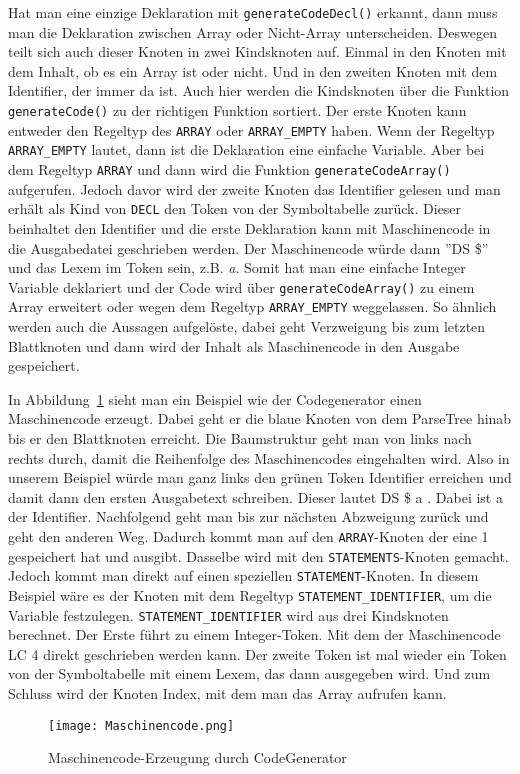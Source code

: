 Hat man eine einzige Deklaration mit \texttt{generateCodeDecl()} erkannt, dann muss man die Deklaration zwischen Array oder  Nicht-Array unterscheiden. Deswegen teilt sich auch dieser Knoten in zwei Kindsknoten auf. Einmal in den Knoten mit dem Inhalt, ob es ein Array ist oder nicht. Und in den zweiten Knoten mit dem Identifier, der immer da ist. Auch hier werden die Kindsknoten über die Funktion \texttt{generateCode()} zu der richtigen Funktion sortiert. Der erste Knoten kann entweder den Regeltyp des \texttt{ARRAY} oder \texttt{ARRAY\_EMPTY} haben. Wenn der Regeltyp \texttt{ARRAY\_EMPTY} lautet, dann ist die Deklaration eine einfache Variable. Aber bei dem Regeltyp \texttt{ARRAY} und dann wird die Funktion \texttt{generateCodeArray()} aufgerufen. Jedoch davor wird der zweite Knoten das Identifier gelesen und man erhält als Kind von \texttt{DECL} den Token von der Symboltabelle zurück. Dieser beinhaltet den Identifier und die erste Deklaration kann mit Maschinencode in die Ausgabedatei geschrieben werden. Der Maschinencode würde dann ''DS \$'' und das Lexem im Token sein, z.B. \emph{a}. Somit hat man eine einfache Integer Variable deklariert und der Code wird über \texttt{generateCodeArray()} zu einem Array erweitert oder wegen dem Regeltyp \texttt{ARRAY\_EMPTY} weggelassen. So ähnlich werden auch die Aussagen aufgelöste, dabei geht Verzweigung bis zum letzten Blattknoten und dann wird der Inhalt als Maschinencode in den Ausgabe gespeichert.



In Abbildung~\ref{fig:codegenerator} sieht man ein Beispiel wie der Codegenerator einen Maschinencode erzeugt. Dabei geht er die blaue Knoten von dem ParseTree hinab bis er den Blattknoten erreicht. Die Baumstruktur geht man von links nach rechts durch, damit die Reihenfolge des Maschinencodes eingehalten wird. Also in unserem Beispiel würde man ganz links den grünen Token Identifier erreichen und damit dann den ersten Ausgabetext schreiben. Dieser lautet DS \$ a . Dabei ist a der Identifier. Nachfolgend geht man bis zur nächsten Abzweigung zurück und geht den anderen Weg. Dadurch kommt man auf den \texttt{ARRAY}-Knoten der eine 1 gespeichert hat und ausgibt. Dasselbe wird mit den \texttt{STATEMENTS}-Knoten gemacht. Jedoch  kommt man direkt auf  einen speziellen \texttt{STATEMENT}-Knoten. In diesem Beispiel wäre es der Knoten mit dem Regeltyp \texttt{STATEMENT\_IDENTIFIER}, um die Variable festzulegen. \texttt{STATEMENT\_IDENTIFIER} wird aus drei Kindsknoten berechnet. Der Erste führt zu einem Integer-Token. Mit dem der Maschinencode LC 4 direkt geschrieben werden kann. Der zweite Token ist mal wieder ein Token von der Symboltabelle mit einem Lexem, das dann ausgegeben wird. Und zum Schluss wird der Knoten Index, mit dem man das Array aufrufen kann.
\vspace{4cm}

\begin{figure}[!htb]
    \centering
      \texttt{[image: Maschinencode.png]}
    \caption{Maschinencode-Erzeugung durch CodeGenerator}\label{fig:codegenerator}
\end{figure}
